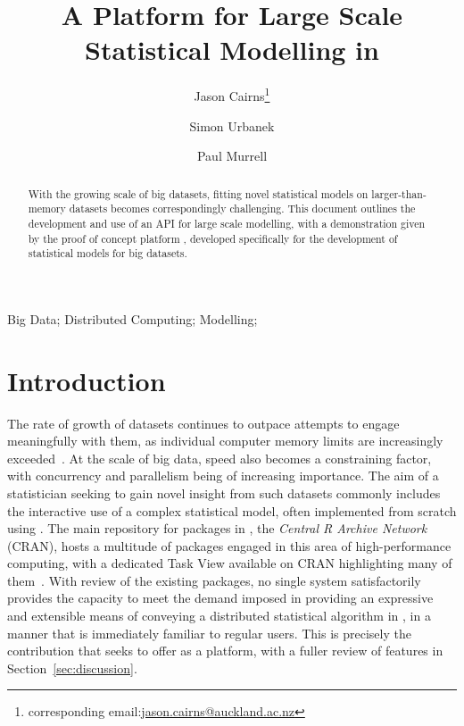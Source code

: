 \documentclass[letterpaper, inpress]{jds} %
\title{A Platform for Large Scale Statistical Modelling in \proglang{R}}
\author[1]{Jason Cairns\thanks{corresponding email:\href{mailto:jason.cairns@auckland.ac.nz}{jason.cairns@auckland.ac.nz}}}
\author[1]{Simon Urbanek}
\author[1]{Paul Murrell}
\affil[1]{Department of Statistics, University of Auckland, New Zealand}
\begin{document}
\maketitle

\begin{abstract}
With the growing scale of big datasets, fitting novel statistical models on larger-than-memory datasets becomes correspondingly challenging.
This document outlines the development and use of an API for large scale modelling, with a demonstration given by the proof of concept platform , developed specifically for the development of statistical models for big datasets.
\end{abstract}
\begin{keywords} %
Big Data;
Distributed Computing;
Modelling;
\end{keywords}

\section{Introduction}%
\label{sec:intro}

The rate of growth of datasets continues to outpace attempts to engage meaningfully with them, as individual computer memory limits are increasingly exceeded~\citep{kleppmann2017dataintensive}.
At the scale of big data, speed also becomes a constraining factor, with concurrency and parallelism being of increasing importance.
The aim of a statistician seeking to gain novel insight from such datasets commonly includes the interactive use of a complex statistical model, often implemented from scratch using .
The main repository for packages in , the \textit{Central R Archive Network} (CRAN), hosts a multitude of packages engaged in this area of high-performance computing, with a dedicated Task View available on CRAN highlighting many of them~\citep{cran_hpc}.
With review of the existing packages, no single system satisfactorily provides the capacity to meet the demand imposed in providing an expressive and extensible means of conveying a distributed statistical algorithm in , in a manner that is immediately familiar to regular  users.
This is precisely the contribution that  seeks to offer as a platform, with a fuller review of features in Section~\ref{sec:discussion}.
\end{document}
